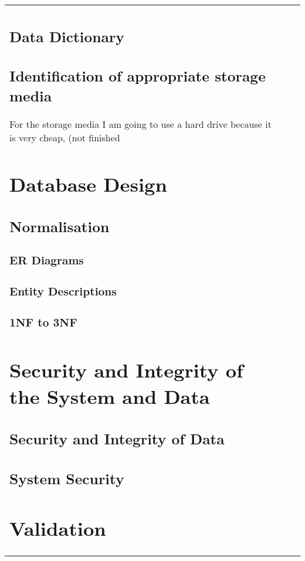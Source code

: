 \begin{itemize}
\begin{center}
\begin{tabular}{|p{}|p{}|p{}}
\subsection{Data Dictionary}

\subsection{Identification of appropriate storage media}

For the storage media I am going to use a hard drive because it is very cheap, (not finished

\section{Database Design}

\subsection{Normalisation}

\subsubsection{ER Diagrams}

\subsubsection{Entity Descriptions}

\subsubsection{1NF to 3NF}

\section{Security and Integrity of the System and Data}

\subsection{Security and Integrity of Data}

\subsection{System Security}

\section{Validation}


\end{tabular}
\end{center}
\end{itemize}
